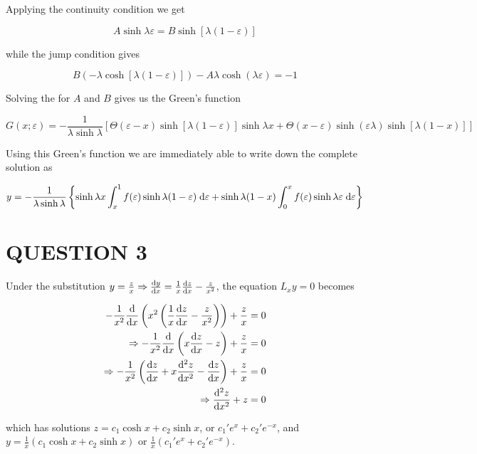 \documentclass[a4paper]{article}
\begin{document}
Applying the continuity condition we get

\[ A \sinh \lambda \varepsilon = B \sinh[\lambda(1-\varepsilon)] \]
 
while the jump condition gives 

\[ B(- \lambda \cosh[\lambda(1-\varepsilon)] ) - A \lambda \cosh( \lambda \varepsilon) = -1 \]

Solving the for $ A $ and $ B $ gives us the Green's function

\[ G(x;\varepsilon) = - \frac{1}{ \lambda \sinh \lambda} \left[  \Theta( \varepsilon - x) \sinh[  \lambda(1 - \varepsilon) ] \sinh \lambda x  + \Theta(x - \varepsilon) \sinh(\varepsilon \lambda) \sinh[\lambda(1-x)]  \right]   \]

Using this Green's function we are immediately able to write down the complete solution as

\[ y = - \frac{1}{\lambda \sinh \lambda} \left\{  \sinh \lambda x \int_{x}^{1}f(\varepsilon) \sinh \lambda(1-\varepsilon) \; \mathrm{d} \varepsilon + \sinh \lambda(1-x)\int_{0}^{x} f(\varepsilon) \sinh \lambda \varepsilon \; \mathrm{d} \varepsilon \right\}  \]


\section{QUESTION 3}

Under the substitution $ y = \frac{z}{x} \Rightarrow \frac{\mathrm{d} y}{\mathrm{d} x} =  \frac{1}{x} \frac{\mathrm{d} z}{\mathrm{d} x} - \frac{z}{x^{2}} $, the equation $ L_{x}y = 0 $ becomes

\begin{align*}
- \frac{1}{x^{2}} \frac{\mathrm{d} }{\mathrm{d} x} \left(  x^{2} \left(  \frac{1}{x} \frac{\mathrm{d} z}{\mathrm{d} x} - \frac{z}{x^{2}}  \right)   \right) +  \frac{z}{x}    & =  0 \\
\Rightarrow - \frac{1}{x^{2}} \frac{\mathrm{d} }{\mathrm{d} x} \left( x \frac{\mathrm{d} z}{\mathrm{d} x} - z  \right)  +  \frac{z}{x}    & =  0 \\
\Rightarrow - \frac{1}{x^{2}} \left( \frac{\mathrm{d} z}{\mathrm{d} x} + x \frac{\mathrm{d}^{2} z}{\mathrm{d} x^{2}} - \frac{\mathrm{d} z}{\mathrm{d} x}  \right)  +  \frac{z}{x}    & =  0 \\
\Rightarrow \frac{\mathrm{d}^{2} z}{\mathrm{d} x^{2}} + z & = 0
\end{align*}

which has solutions $ z = c_{1} \cosh x + c_{2} \sinh x $, or $ c_{1}'e^{x} + c_{2}'e^{-x} $, and $ y = \frac{1}{x} \left(  c_{1} \cosh x + c_{2} \sinh x \right)  $ or $ \frac{1}{x} \left( c_{1}'e^{x} + c_{2}'e^{-x} \right)  $.
\end{document}
